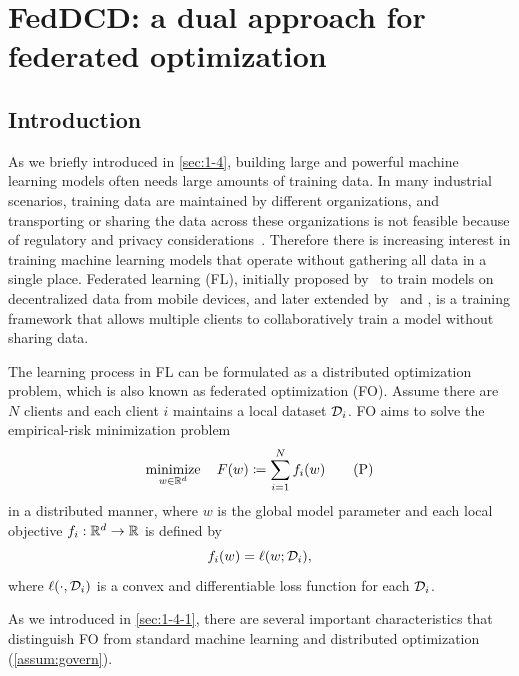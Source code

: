 \chapter{FedDCD: a dual approach for federated optimization}
\label{ch:Dual-Fed-Opt}

\section{Introduction} \label{sec:6-1}

As we briefly introduced in \autoref{sec:1-4}, building large and powerful machine learning models often needs large amounts of training data. In many industrial scenarios, training data are maintained by different organizations, and transporting or sharing the data across these organizations is not feasible because of regulatory and privacy considerations~\citep{li2020review}. Therefore there is increasing interest in training machine learning models that operate without gathering all data in a single place. Federated learning (FL), initially proposed by~\citet{mcmahan2017communication} to train models on decentralized data from mobile devices, and later extended by~\citet{yang2019federated} and \citet{kairouz2019advances}, is a training framework that allows multiple clients to collaboratively train a model without sharing data. 

The learning process in FL can be formulated as a distributed optimization problem, which is also known as federated optimization (FO). Assume there are $N$ clients and each client $i$ maintains a local dataset $\mathcal{D}_i$. FO aims to solve the  empirical-risk minimization problem
\begin{equation} \label{eq:primal}
  \displaystyle\mathop{\hbox{\rm minimize}}_{w\in\mathbb{R}^d}\enspace\enspace F(w) \coloneqq \sum_{i = 1}^N f_i(w) \tag{P}
\end{equation}
in a distributed manner, where $w$ is the global model parameter and each local objective $f_i:\mathbb{R}^d \to\mathbb{R}$ is defined by 
\begin{equation*} %
    f_i(w) = \ell(w; \Dscr_i),
\end{equation*}
where $\ell(\cdot, \mathcal{D}_i)$ is a convex and differentiable loss function for each $\mathcal{D}_i$. 

As we introduced in \autoref{sec:1-4-1}, there are several important characteristics that distinguish FO from standard machine learning and distributed optimization (\autoref{assum:govern}). 

